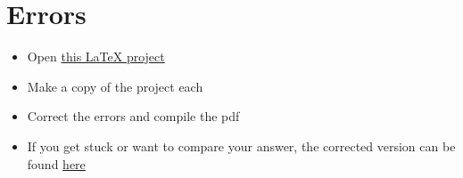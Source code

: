 \documentclass[11pt,a4paper]{article}
\begin{document}
\section{Errors}
\begin{itemize}
\item Open \href{https://www.overleaf.com/read/gnzphcnqgfvf}{this LaTeX project}
\item Make a copy of the project each
\item Correct the errors and compile the pdf
\item If you get stuck or want to compare your answer, the corrected version can be found \href{https://www.overleaf.com/read/zsmyvxvdcvfr}{here}
\end{itemize}
\end{document}
